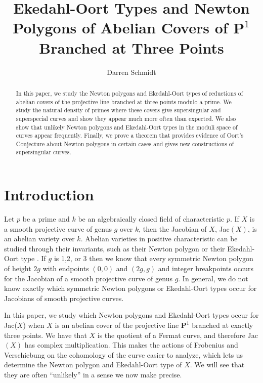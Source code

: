 \documentclass{article}
\title{Ekedahl-Oort Types and Newton Polygons of Abelian Covers of $\mathbf{P}^1$ Branched at Three Points}
\author{Darren Schmidt}
\date{}
\theoremstyle{remark}
\theoremstyle{definition}
\begin{document}
\maketitle


\begin{abstract}
    In this paper, we study the Newton polygons and Ekedahl-Oort types of reductions of abelian covers of the projective line branched at three points modulo a prime. We study the natural density of primes where these covers give supersingular and superspecial curves and show they appear much more often than expected. We also show that unlikely Newton polygons and Ekedahl-Oort types in the moduli space of curves appear frequently. Finally, we prove a theorem that provides evidence of Oort's Conjecture about Newton polygons in certain cases and gives new constructions of supersingular curves.
\end{abstract}
\let\thefootnote\relax{}

\section{Introduction}
\par \hspace{\parindent}
Let $p$ be a prime and $k$ be an algebraically closed field of characteristic $p$. If $X$ is a smooth projective curve of genus $g$ over $k$, then the Jacobian of $X$, Jac$(X)$, is an abelian variety over $k$. Abelian varieties in positive characteristic can be studied through their invariants, such as their Newton polygon \cite[Section 4.2]{pries_torelli} or their Ekedahl-Oort type \cite[Section 4.4]{pries_torelli}. If $g$ is 1,2, or 3 then we know that every symmetric Newton polygon  of height $2g$ with endpoints $(0,0)$ and $(2g,g)$ and integer breakpoints occurs for the Jacobian of a smooth projective curve of genus $g$. In general, we do not know exactly which symmetric Newton polygons or Ekedahl-Oort types occur for Jacobians of smooth projective curves.

\par In this paper, we study which Newton polygons and Ekedahl-Oort types occur for Jac($X$) when $X$ is an abelian cover of the projective line $\mathbf{P}^1$ branched at exactly three points. We have that $X$ is the quotient of a Fermat curve, and therefore Jac$(X)$ has complex multiplication. This makes the actions of Frobenius and Verschiebung on the cohomology of the curve easier to analyze, which lets us determine the Newton polygon and Ekedahl-Oort type of $X$. We will see that they are often ``unlikely'' in a sense we now make precise.
\end{document}
